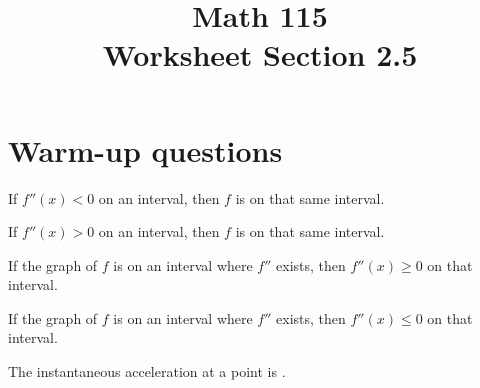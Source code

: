 \documentclass[11pt]{exam}
\title{\vspace{-1in} Math 115 \\ Worksheet Section 2.5}
\date{}
\begin{document}
\maketitle
\vspace{-0.75in}
\section*{Warm-up questions}

\noindent
If $f''(x)<0$ on an interval, then $f$ is  on that same interval.

\noindent
If $f''(x)>0$ on an interval, then $f$ is \fillin[concave up] on that same interval.

\noindent
If the graph of $f$ is \fillin[concave up] on an interval where $f''$ exists, then $f''(x) \geqslant 0$ on that interval.

\noindent
If the graph of $f$ is  on an interval where $f''$ exists, then $f''(x) \leqslant 0$ on that interval.

\noindent
The instantaneous acceleration at a point is .
\vspace{1em}

\noindent
\end{document}
